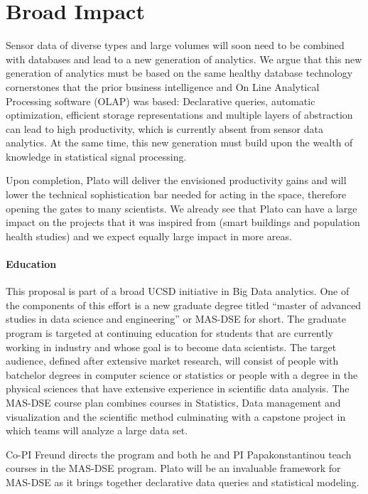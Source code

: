 \section{Broad Impact}
\label{sec:broad-impact}
Sensor data of diverse types and large volumes will soon need to be combined with databases and lead to a new generation of analytics. We argue that this new generation of analytics must be based on the same healthy database technology cornerstones that the prior business intelligence and On Line Analytical Processing software (OLAP) was based: Declarative queries, automatic optimization, efficient storage representations and multiple layers of abstraction can lead to high productivity, which is currently absent from sensor data analytics. At the same time, this new generation must build upon the wealth of knowledge in statistical signal processing. 

Upon completion, Plato will deliver the envisioned productivity gains and will lower the technical sophistication bar needed for acting in the space, therefore opening the gates to many scientists. We already see that Plato can have a large impact on the projects that it was inspired from (smart buildings and population health studies) and we expect equally large impact in more areas.

\paragraph{Education} This proposal is part of a broad UCSD initiative in Big Data
analytics. One of the components of this effort is a new graduate
degree titled ``master of advanced studies in data science and
engineering'' or MAS-DSE for short. The graduate program is targeted
at continuing education for students that are currently working in
industry and whose goal is to become data scientists. The target
audience, defined after extensive market research, will consist of
people with batchelor degrees in computer science or statistics or
people with a degree in the physical sciences that have extensive
experience in scientific data analysis. The MAS-DSE course plan
combines courses in Statistics, Data management and visualization and
the scientific method culminating with a capstone project in which
teams will analyze a large data set.

Co-PI Freund directs the program and both he and PI Papakonstantinou
teach courses in the MAS-DSE program. Plato will be an
invaluable framework for MAS-DSE as it brings together declarative
data queries and statistical modeling.


